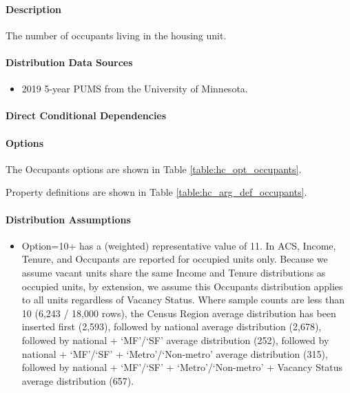 \paragraph{Description}
% 
The number of occupants living in the housing unit.

\paragraph{Distribution Data Sources}
% 
\begin{itemize}
\item
  2019 5-year PUMS from the University of Minnesota.
\end{itemize}

\paragraph{Direct Conditional Dependencies}


\paragraph{Options}
The Occupants options are shown in Table \ref{table:hc_opt_occupants}.



Property definitions are shown in Table \ref{table:hc_arg_def_occupants}.



\paragraph{Distribution Assumptions}
% 
\begin{itemize}
\item
  Option=10+ has a (weighted) representative value of 11. In ACS,
  Income, Tenure, and Occupants are reported for occupied units only.
  Because we assume vacant units share the same Income and Tenure
  distributions as occupied units, by extension, we assume this
  Occupants distribution applies to all units regardless of Vacancy
  Status. Where sample counts are less than 10 (6,243 / 18,000 rows), the
  Census Region average distribution has been inserted first (2,593),
  followed by national average distribution (2,678), followed by national
  +
 `MF'/`SF'
  average distribution (252), followed by national +
  `MF'/`SF'
  +
  `Metro'/`Non-metro'
  average distribution (315), followed by national +
  `MF'/`SF'
  +
  `Metro'/`Non-metro'
  + Vacancy Status average distribution (657).
\end{itemize}
